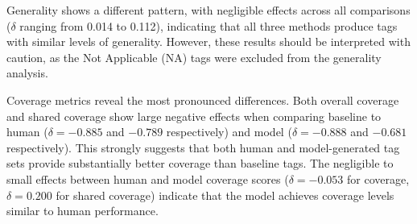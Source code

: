 Generality shows a different pattern, with negligible effects across all comparisons ($\delta$ ranging from 0.014 to 0.112), indicating that all three methods produce tags with similar levels of generality. However, these results should be interpreted with caution, as the Not Applicable (NA) tags were excluded from the generality analysis.

Coverage metrics reveal the most pronounced differences. Both overall coverage and shared coverage show large negative effects when comparing baseline to human ($\delta = -0.885$ and $-0.789$ respectively) and model ($\delta = -0.888$ and $-0.681$ respectively). This strongly suggests that both human and model-generated tag sets provide substantially better coverage than baseline tags. The negligible to small effects between human and model coverage scores ($\delta = -0.053$ for coverage, $\delta = 0.200$ for shared coverage) indicate that the model achieves coverage levels similar to human performance.

